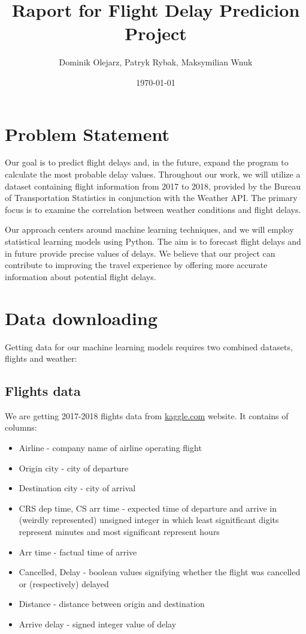 \documentclass{article}
\title{Raport for Flight Delay Predicion Project} %
\author{Dominik Olejarz, Patryk Rybak, Maksymilian Wnuk} %
\date{\today} %
\begin{document}
 \maketitle
    
 \section{Problem Statement} %

Our goal is to predict flight delays and, in the future, expand the program to calculate the most probable delay values. Throughout our work, we will utilize a dataset containing flight information from 2017 to 2018, provided by the Bureau of Transportation Statistics in conjunction with the Weather API. The primary focus is to examine the correlation between weather conditions and flight delays.

Our approach centers around machine learning techniques, and we will employ statistical learning models using Python. The aim is to forecast flight delays and in future provide precise values of delays. We believe that our project can contribute to improving the travel experience by offering more accurate information about potential flight delays.

    
 \section{Data downloading}
Getting data for our machine learning models requires two combined datasets, 
flights and weather:
	\subsection{Flights data}
		We are getting 2017-2018 flights data from \url{kaggle.com} website.
		It contains of columns:	
			\begin{itemize}
\item Airline - company name of airline operating flight
\item Origin city  - city of departure
\item Destination city - city of arrival
\item CRS dep time, CS arr time - expected time of departure and arrive in (weirdly represented) unsigned integer in which 
		least signitficant digits represent minutes and most significant represent hours
\item Arr time - factual time of arrive
\item Cancelled, Delay - boolean values signifying whether the flight was cancelled or (respectively) delayed
\item Distance  - distance between origin and destination
\item Arrive delay - signed integer value of delay
				
			\end{itemize}
\end{document}
